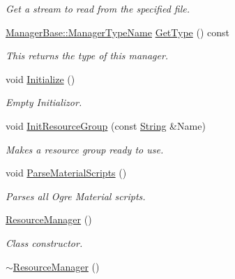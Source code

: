 \begin{DoxyCompactItemize}
\begin{DoxyCompactList}\small\item\em Get a stream to read from the specified file. \item\end{DoxyCompactList}\item 
\hyperlink{classphys_1_1ManagerBase_aaa6ccddf23892eaccb898529414f80a5}{ManagerBase::ManagerTypeName} \hyperlink{classphys_1_1ResourceManager_a9e5468e5428f5c108c7b3c01e94eba46}{GetType} () const 
\begin{DoxyCompactList}\small\item\em This returns the type of this manager. \item\end{DoxyCompactList}\item 
void \hyperlink{classphys_1_1ResourceManager_a9be3250f1f1153c9e079f82736eb00a8}{Initialize} ()
\begin{DoxyCompactList}\small\item\em Empty Initializor. \item\end{DoxyCompactList}\item 
void \hyperlink{classphys_1_1ResourceManager_aa2f44129dfc3dc0b0ee332a2bba6078d}{InitResourceGroup} (const \hyperlink{namespacephys_aa03900411993de7fbfec4789bc1d392e}{String} \&Name)
\begin{DoxyCompactList}\small\item\em Makes a resource group ready to use. \item\end{DoxyCompactList}\item 
\hypertarget{classphys_1_1ResourceManager_a348f333ffd9638decd144bf9d65ca05d}{
void \hyperlink{classphys_1_1ResourceManager_a348f333ffd9638decd144bf9d65ca05d}{ParseMaterialScripts} ()}
\label{classphys_1_1ResourceManager_a348f333ffd9638decd144bf9d65ca05d}

\begin{DoxyCompactList}\small\item\em Parses all Ogre Material scripts. \item\end{DoxyCompactList}\item 
\hyperlink{classphys_1_1ResourceManager_af114d84fa357432db4184bfd322495b6}{ResourceManager} ()
\begin{DoxyCompactList}\small\item\em Class constructor. \item\end{DoxyCompactList}\item 
\hyperlink{classphys_1_1ResourceManager_a426d4d684a9ecf98359362243ce01072}{$\sim$ResourceManager} ()
\end{DoxyCompactItemize}
